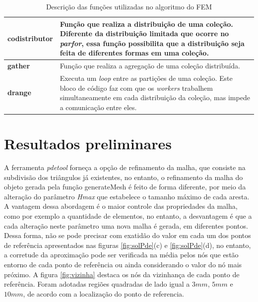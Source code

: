 \documentclass[
    12pt,               %
    openright,          %
    oneside,
    a4paper,            %
    english,            %
    french,             %
    spanish,            %
    brazil              %
    ]{abntex2}
\begin{document}
\begin{table}[!ht]
\begin{tabular}{|l|p{10cm}|}
		\hline	
		\textbf{codistributor}
		& Função que realiza a distribuição de uma coleção. Diferente da distribuição limitada que ocorre no \textit{parfor}, essa função possibilita que a distribuição seja feita de diferentes formas em uma coleção. 
		\\
		\hline
		\textbf{gather}
		& Função que realiza a agregação de uma coleção distribuída.
		\\
		\hline
		\textbf{drange}  
		& Executa um \textit{loop} entre as partições de uma coleção. Este bloco de código faz com que os \textit{workers} trabalhem simultaneamente em cada distribuição da coleção, mas impede a comunicação entre eles.
		\\
		\hline	
	\end{tabular}
	\caption{Descrição das funções utilizadas no algoritmo do FEM}
	\label{tab:partool}
\end{table}

\section{Resultados preliminares}
A ferramenta \textit{pdetool} forneça a opção de refinamento da malha, que consiste na subdivisão dos triângulos já existentes, no entanto, o refinamento da malha do objeto gerada pela função generateMesh é feito de forma diferente, por meio da alteração do parâmetro \textit{Hmax} que estabelece o tamanho máximo de cada aresta. A vantagem dessa abordagem é o maior controle das propriedades da malha, como por exemplo a quantidade de elementos, no entanto, a desvantagem é que a cada alteração neste parâmetro uma nova malha é gerada, em diferentes pontos. Dessa forma, não se pode precisar com exatidão do valor em cada um dos pontos de referência apresentados nas figuras \ref{fig:solPde}{(c)} e \ref{fig:solPde}{(d)}, no entanto, a corretude da aproximação pode ser verificada na média pelos nós que estão entorno de cada ponto de referência ou ainda considerando o valor do nó mais próximo. A figura \ref{fig:vizinha} destaca os nós da vizinhança de cada ponto de referência. Foram adotadas regiões quadradas de lado igual a $3mm$, $5mm$ e $10mm$, de acordo com a localização do ponto de referencia.
\end{document}
